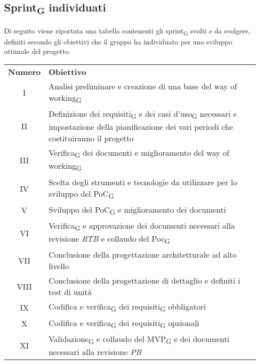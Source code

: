 \subsection{Sprint\textsubscript{G} individuati}
Di seguito viene riportata una tabella contenenti gli sprint\textsubscript{G} svolti e da svolgere, definiti secondo gli obiettivi che il gruppo ha individuato per uno sviluppo ottimale del progetto.
\begin{center}
	\renewcommand\tabularxcolumn[1]{>{\Centering}m{#1}}
	\setlength\extrarowheight{5pt}
	\begin{tabularx}{\textwidth}{| c | X |} 
		\hline
		\rowcolor{white}
		\textbf{Numero} & \textbf{Obiettivo}\\
		I &  Analisi preliminare e creazione di una base del way of working\textsubscript{G} \\
		II & Definizione dei requisiti\textsubscript{G} e dei casi d'uso\textsubscript{G} necessari e impostazione della pianificazione dei vari periodi che costituiranno il progetto \\
		III & Verifica\textsubscript{G} dei documenti e miglioramento del way of working\textsubscript{G} \\
		IV & Scelta degli strumenti e tecnologie da utilizzare per lo sviluppo del PoC\textsubscript{G} \\
		V & Sviluppo del PoC\textsubscript{G} e miglioramento dei documenti \\
		VI & Verifica\textsubscript{G} e approvazione dei documenti necessari alla revisione \textit{RTB} e collaudo del Poc\textsubscript{G}\\
		VII & Conclusione della progettazione architetturale ad alto livello\\
		VIII & Conclusione della progettazione di dettaglio e definiti i test di unità \\
		IX & Codifica e verifica\textsubscript{G} dei requisiti\textsubscript{G} obbligatori \\
		X & Codifica e verifica\textsubscript{G} dei requisiti\textsubscript{G} opzionali \\
		XI & Validazione\textsubscript{G} e collaudo del MVP\textsubscript{G} e dei documenti necessari alla revisione \textit{PB}\\
		\hline
	\end{tabularx}
\end{center}